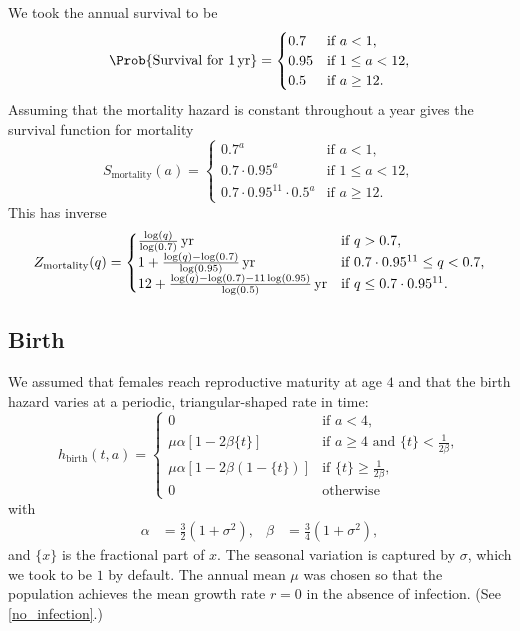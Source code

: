 \documentclass{jpmarticle}
\begin{document}
We took the annual survival to be
\begin{equation}
  \Prob\{\text{Survival for $\unit[1]{yr}$}\}
  =
  \begin{cases}
    0.7 & \text{if $a < 1$},
    \\
    0.95 & \text{if $1 \leq a < 12$},
    \\
    0.5 & \text{if $a \geq 12$}.
  \end{cases}
\end{equation}
Assuming that the mortality hazard is constant throughout a year gives
the survival function for mortality
\begin{equation}
  S_{\text{mortality}}(a) =
  \begin{cases}
    0.7^a & \text{if $a < 1$},
    \\
    0.7 \cdot 0.95^a & \text{if $1 \leq a < 12$},
    \\
    0.7 \cdot 0.95^{11} \cdot 0.5^a & \text{if $a \geq 12$}.
  \end{cases}
\end{equation}
This has inverse
\begin{equation}
  Z_{\text{mortality}}(q) =
  \begin{cases}
    \unit[\frac{\log(q)}{\log(0.7)}]{yr} & \text{if $q > 0.7$},
    \\
    \unit[1 + \frac{\log(q) - \log(0.7)}{\log(0.95)}]{yr}
    & \text{if $0.7 \cdot 0.95^{11} \leq q < 0.7$},
    \\
    \unit[12 + \frac{\log(q) - \log(0.7) - 11 \log(0.95)}{\log(0.5)}]{yr}
    & \text{if $q \leq 0.7 \cdot 0.95^{11}$}.
  \end{cases}
\end{equation}


\subsection{Birth}

We assumed that females reach reproductive maturity at age $4$ and
that the birth hazard varies at a periodic, triangular-shaped rate in
time:
\begin{equation}
  h_{\text{birth}}(t, a) =
  \begin{cases}
    0 & \text{if $a < 4$},
    \\
    \mu \alpha \left[1 - 2 \beta \{t\}\right]
    & \text{if $a \geq 4$ and $\{t\} < \frac{1}{2 \beta}$},
    \\
    \mu \alpha \left[1 - 2 \beta (1 - \{t\})\right]
    & \text{if $\{t\} \geq \frac{1}{2 \beta}$},
    \\
    0 & \text{otherwise}
  \end{cases}
\end{equation}
with
\begin{align}
  \alpha &= \frac{3}{2} (1 + \sigma^2),
  &
  \beta &= \frac{3}{4} (1 + \sigma^2),
\end{align}
and $\{x\}$ is the fractional part of $x$.  The seasonal variation is
captured by $\sigma$, which we took to be $1$ by default.  The annual
mean $\mu$ was chosen so that the population achieves the mean growth
rate $r = 0$ in the absence of infection.  (See
\autoref{no_infection}.)
\end{document}
